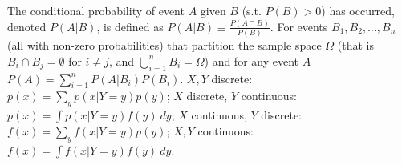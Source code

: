  The conditional probability of event $A$ given $B$ (s.t. $P(B) > 0$) has occurred, denoted $P(A|B)$, is defined as $P(A|B) \equiv \frac{P(A\cap B)}{P(B)}$.
 For events $B_1, B_2, \ldots, B_n$ (all with non-zero probabilities) that partition the sample space $\Omega$ (that is $B_i \cap B_j = \emptyset$ for $i \ne j$, and $\bigcup^{n}_{i=1}B_i = \Omega$) and for any event $A$ $P(A) = \sum^{n}_{i=1}P(A|B_i)P(B_i)$.
 $X,Y$ discrete: $p(x) = \sum_y p(x|Y=y)p(y)$; $X$ discrete, $Y$ continuous: $p(x) = \int p(x|Y=y)f(y)\ dy$; $X$ continuous, $Y$ discrete: $f(x) = \sum_y f(x|Y=y)p(y)$; $X,Y$ continuous: $f(x) = \int f(x|Y=y)f(y)\ dy$.